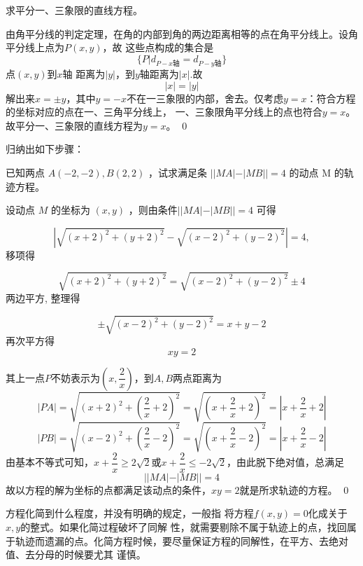 \begin{example}
    求平分一、三象限的直线方程。
\end{example}
\begin{jie}
    由角平分线的判定定理，在角的内部到角的两边距离相等的点在角平分线上。设角平分线上点为\(P(x,y)\)，故
    这些点构成的集合是\[\{P|d_{P-x\text{轴}}=d_{P-y\text{轴}}\}\]
    点\((x,y)\)到\(x\)轴
    距离为\(|y|\)，到\(y\)轴距离为\(|x|\).故
    \[|x|=|y|\]
    解出来\(x=\pm y\)，其中\(y=-x\)不在一三象限的内部，舍去。仅考虑\(y=x\)：符合方程的坐标对应的点在一、三角平分线上，
    一、三象限角平分线上的点也符合\(y=x\)。故平分一、三象限的直线方程为\(y=x\)。
    \qed
\end{jie}

归纳出如下步骤：
\begin{example}
    已知两点 $ A(-2,-2), B(2,2)$ ，试求满足条  $||M A|-|M B||=4$  的动点  M  的轨迹方程。
\end{example}
\begin{jie}
    设动点  $M $ 的坐标为 $ (x, y)$  ，则由条件$||M A|-|M B||=4$
    可得
    
   $$ |\sqrt{(x+2)^{2}+(y+2)^{2}}-\sqrt{(x-2)^{2}+(y-2)^{2}}|=4,$$
    移项得
    
   $$ \sqrt{(x+2)^{2}+(y+2)^{2}}=\sqrt{(x-2)^{2}+(y-2)^{2}}\pm 4$$
    两边平方, 整理得
    
  $$\pm \sqrt{(x-2)^{2}+(y-2)^{2}}=x+y-2 $$
    再次平方得
   $$ x y=2$$

   其上一点\(P\)不妨表示为\((x,\dfrac{2}{x})\)，到\(A,B\)两点距离为
   \[|PA|=\sqrt{(x+2)^2+(\frac{2}{x}+2)^2}=\sqrt{(x+\frac{2}{x}+2)^2}=|x+\frac{2}{x}+2|\]
    \[|PB|=\sqrt{(x-2)^2+(\frac{2}{x}-2)^2}=\sqrt{(x+\frac{2}{x}-2)^2}=|x+\frac{2}{x}-2|\]
    由基本不等式可知，\(x+\dfrac{2}{x}\geq 2\sqrt{2}\)或\(x+\dfrac{2}{x}\leq -2\sqrt{2}\)，由此脱下绝对值，总满足
    \[||M A|-|M B||=4\]
    故以方程的解为坐标的点都满足该动点的条件，\(xy=2\)就是所求轨迹的方程。
    \qed
\end{jie}
方程化简到什么程度，并没有明确的规定，一般指
将方程\(f(x,y)=0\)化成关于\(x,y\)的整式。如果化简过程破坏了同解
性，就需要剔除不属于轨迹上的点，找回属于轨迹而遗漏的点。化简方程时候，要尽量保证方程的同解性，在平方、去绝对值、去分母的时候要尤其
谨慎。


